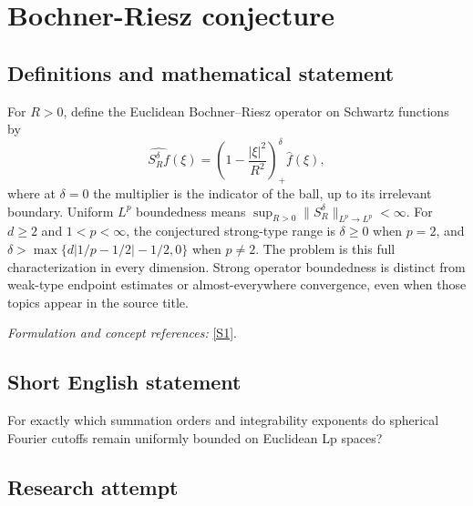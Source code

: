 \documentclass[11pt,a4paper]{article}
\newcommand{\sref}[2]{\hyperlink{source:#1:#2}{[S#2]}}
\newif\ifshowcatalogue
\newcommand{\cataloguescope}[1]{\ifshowcatalogue
 \paragraph{Exact scope in the supplied catalogue.}
 \begin{quote}\small #1\end{quote}\fi}
\numberwithin{equation}{section}
\begin{document}
\setcounter{section}{0}
\clearpage
\section*{\texorpdfstring{Bochner-Riesz conjecture}{Bochner-Riesz conjecture}}\label{30006774}
\subsection{Definitions and mathematical statement}
For $R>0$, define the Euclidean Bochner--Riesz operator on Schwartz functions by
\[
 \widehat{S_R^\delta f}(\xi)=\left(1-\frac{|\xi|^2}{R^2}\right)_+^\delta\widehat f(\xi),
\]
where at $\delta=0$ the multiplier is the indicator of the ball, up to its irrelevant boundary. Uniform $L^p$ boundedness means
$\sup_{R>0}\|S_R^\delta\|_{L^p\to L^p}<\infty$.
For $d\ge2$ and $1<p<\infty$, the conjectured strong-type range is $\delta\ge0$ when $p=2$, and
$\delta>\max\{d|1/p-1/2|-1/2,0\}$ when $p\ne2$.
The problem is this full characterization in every dimension. Strong operator boundedness is distinct from weak-type endpoint estimates or almost-everywhere convergence, even when those topics appear in the source title.
\par\smallskip\textit{Formulation and concept references:} \sref{30006774}{1}.
\cataloguescope{Prove the sharp conjectured characterization of all orders delta greater than or equal to zero and exponents 1<p<infinity for which the Euclidean Bochner-Riesz means are uniformly bounded on L\textasciicircum{}p(R\textasciicircum{}d), in every dimension d at least 2.}
\subsection{Short English statement}
For exactly which summation orders and integrability exponents do spherical Fourier cutoffs remain uniformly bounded on Euclidean Lp spaces?
\subsection{Research attempt}
\end{document}
